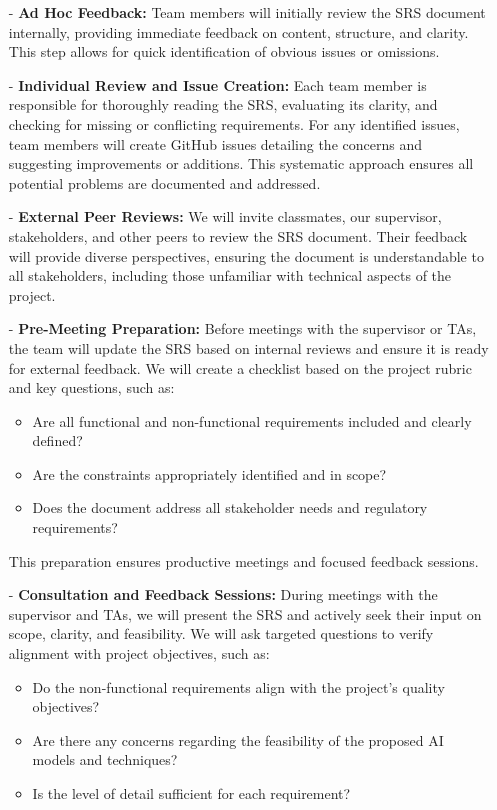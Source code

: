 \documentclass[12pt, titlepage]{article}
\begin{document}
\begin{itemize}
    \item[-] \textbf{Ad Hoc Feedback:} Team members will initially review the SRS document internally, providing immediate feedback on content, structure, and clarity. This step allows for quick identification of obvious issues or omissions.
    
    \item[-] \textbf{Individual Review and Issue Creation:} Each team member is responsible for thoroughly reading the SRS, evaluating its clarity, and checking for missing or conflicting requirements. For any identified issues, team members will create GitHub issues detailing the concerns and suggesting improvements or additions. This systematic approach ensures all potential problems are documented and addressed.
    
    \item[-] \textbf{External Peer Reviews:} We will invite classmates, our supervisor, stakeholders, and other peers to review the SRS document. Their feedback will provide diverse perspectives, ensuring the document is understandable to all stakeholders, including those unfamiliar with technical aspects of the project.
    
    \item[-] \textbf{Pre-Meeting Preparation:} Before meetings with the supervisor or TAs, the team will update the SRS based on internal reviews and ensure it is ready for external feedback. We will create a checklist based on the project rubric and key questions, such as:
    \begin{itemize}
        \item Are all functional and non-functional requirements included and clearly defined?
        \item Are the constraints appropriately identified and in scope?
        \item Does the document address all stakeholder needs and regulatory requirements?
    \end{itemize}
    This preparation ensures productive meetings and focused feedback sessions.
    
    \item[-] \textbf{Consultation and Feedback Sessions:} During meetings with the supervisor and TAs, we will present the SRS and actively seek their input on scope, clarity, and feasibility. We will ask targeted questions to verify alignment with project objectives, such as:
    \begin{itemize}
        \item Do the non-functional requirements align with the project's quality objectives?
        \item Are there any concerns regarding the feasibility of the proposed AI models and techniques?
        \item Is the level of detail sufficient for each requirement?
    \end{itemize}
    

\end{itemize}
\end{document}
